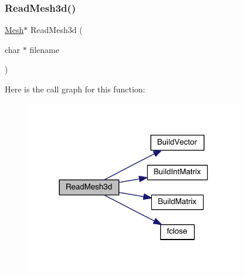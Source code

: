 \subsubsection{\texorpdfstring{Read\+Mesh3d()}{ReadMesh3d()}}
{\footnotesize\ttfamily \hyperlink{a00557_aeffbe0891ab73a4d8964c9cb7978426e}{Mesh}$\ast$ Read\+Mesh3d (\begin{DoxyParamCaption}\item[{char $\ast$}]{filename }\end{DoxyParamCaption})}

Here is the call graph for this function\+:\nopagebreak
\begin{figure}[H]
\begin{center}
\leavevmode
\includegraphics[width=270pt]{a00590_ae31747f9df306a59e6f4df61fddfe15f_cgraph}
\end{center}
\end{figure}
